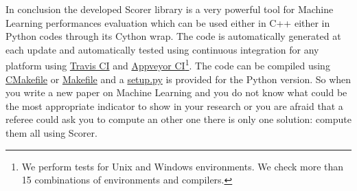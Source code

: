 \documentclass{standalone}
\begin{document}
In conclusion the developed \textsf{Scorer} library is a very powerful tool for Machine Learning performances evaluation which can be used either in \textsf{C++} either in \textsf{Python} codes through its \textsf{Cython} wrap.
The code is automatically generated at each update and automatically tested using continuous integration for any platform using \href{https://github.com/Nico-Curti/scorer/blob/master/.travis.yml}{Travis CI} and \href{https://github.com/Nico-Curti/scorer/blob/master/appveyor.yml}{Appveyor CI}\footnote{
  We perform tests for Unix and Windows environments.
  We check more than 15 combinations of environments and compilers.
}.
The code can be compiled using \href{https://github.com/Nico-Curti/scorer/blob/master/CMakeLists.txt}{\textsf{CMakefile}} or \href{https://github.com/Nico-Curti/scorer/blob/master/Makefile}{\textsf{Makefile}} and a \href{https://github.com/Nico-Curti/scorer/blob/master/setup.py}{\textsf{setup.py}} is provided for the \textsf{Python} version.
So when you write a new paper on Machine Learning and you do not know what could be the most appropriate indicator to show in your research or you are afraid that a referee could ask you to compute an other one there is only one solution: compute them all using \textsf{Scorer}.
\end{document}
